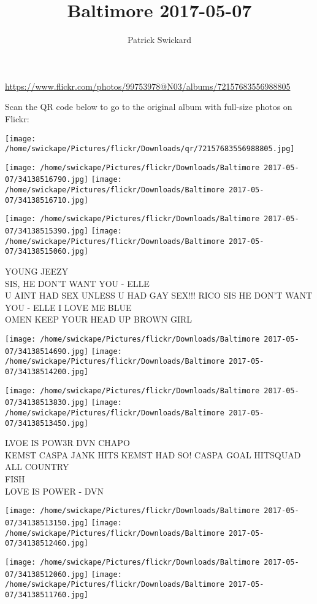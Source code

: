 \documentclass[10pt,letterpaper]{article}
\title{Baltimore 2017-05-07}
\author{Patrick Swickard}
\date{}
\begin{document}
\maketitle

\url{https://www.flickr.com/photos/99753978@N03/albums/72157683556988805}

Scan the QR code below to go to the original album with full-size photos on Flickr:

\texttt{[image: /home/swickape/Pictures/flickr/Downloads/qr/72157683556988805.jpg]}
\pagebreak

\texttt{[image: /home/swickape/Pictures/flickr/Downloads/Baltimore 2017-05-07/34138516790.jpg]}
\texttt{[image: /home/swickape/Pictures/flickr/Downloads/Baltimore 2017-05-07/34138516710.jpg]}

\texttt{[image: /home/swickape/Pictures/flickr/Downloads/Baltimore 2017-05-07/34138515390.jpg]}
\texttt{[image: /home/swickape/Pictures/flickr/Downloads/Baltimore 2017-05-07/34138515060.jpg]}

YOUNG JEEZY\\
SIS, HE DON'T WANT YOU {-} ELLE\\
U AINT HAD SEX UNLESS U HAD GAY SEX!!! RICO SIS HE DON'T WANT YOU {-} ELLE I LOVE ME BLUE\\
OMEN KEEP YOUR HEAD UP BROWN GIRL
\pagebreak

\texttt{[image: /home/swickape/Pictures/flickr/Downloads/Baltimore 2017-05-07/34138514690.jpg]}
\texttt{[image: /home/swickape/Pictures/flickr/Downloads/Baltimore 2017-05-07/34138514200.jpg]}

\texttt{[image: /home/swickape/Pictures/flickr/Downloads/Baltimore 2017-05-07/34138513830.jpg]}
\texttt{[image: /home/swickape/Pictures/flickr/Downloads/Baltimore 2017-05-07/34138513450.jpg]}

LVOE IS POW3R DVN CHAPO\\
KEMST CASPA JANK HITS KEMST HAD SO! CASPA GOAL HITSQUAD ALL COUNTRY\\
FISH\\
LOVE IS POWER {-} DVN
\pagebreak

\texttt{[image: /home/swickape/Pictures/flickr/Downloads/Baltimore 2017-05-07/34138513150.jpg]}
\texttt{[image: /home/swickape/Pictures/flickr/Downloads/Baltimore 2017-05-07/34138512460.jpg]}

\texttt{[image: /home/swickape/Pictures/flickr/Downloads/Baltimore 2017-05-07/34138512060.jpg]}
\texttt{[image: /home/swickape/Pictures/flickr/Downloads/Baltimore 2017-05-07/34138511760.jpg]}
\end{document}
